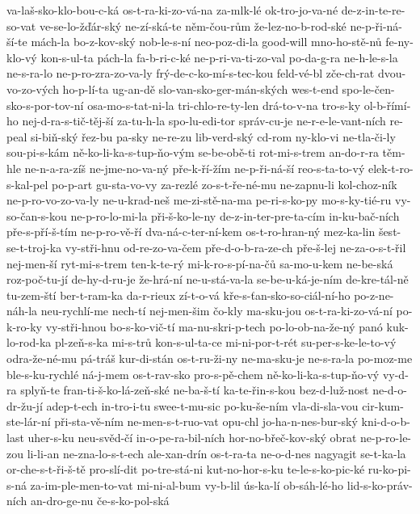 va-laš-sko-klo-bou-c-ká
os-t-ra-ki-zo-vá-na
za-mlk-lé
ok-tro-jo-va-né
de-z-in-te-re-so-vat
ve-se-lo-žďár-ský
ne-zí-ská-te
něm-čou-rům
že-lez-no-b-rod-ské
ne-p-ři-ná-ší-te
mách-la
bo-z-kov-ský
nob-le-s-ní
neo-poz-di-la
good-will
mno-ho-stě-nů
fe-ny-klo-vý
kon-s-ul-ta
pách-la
fa-b-ri-c-ké
ne-p-ri-va-ti-zo-val
po-da-g-ra
ne-h-le-s-la
ne-s-ra-lo
ne-p-ro-zra-zo-va-ly
frý-de-c-ko-mí-s-tec-kou
feld-vé-bl
zče-ch-rat
dvou-vo-zo-vých
ho-p-lí-ta
ug-an-dě
slo-van-sko-ger-mán-ských
wes-t-end
spo-le-čen-sko-s-por-tov-ní
osa-mo-s-tat-ni-la
tri-chlo-re-ty-len
drá-to-v-na
tro-s-ky
ol-b-římí-ho
nej-d-ra-s-tič-těj-ší
za-tu-h-la
spo-lu-edi-tor
správ-cu-je
ne-r-e-le-vant-ních
re-peal
si-biň-ský
řez-bu
pa-sky
ne-re-zu
lib-verd-ský
cd-rom
ny-klo-vi
ne-tla-či-ly
sou-pi-s-kám
ně-ko-li-ka-s-tup-ňo-vým
se-be-obě-ti
rot-mi-s-trem
an-do-r-ra
těm-hle
ne-n-a-ra-zíš
ne-jme-no-va-ný
pře-k-ří-žím
ne-p-ři-ná-ší
reo-s-ta-to-vý
elek-t-ro-s-kal-pel
po-p-art
gu-sta-vo-vy
za-rezlé
zo-s-t-ře-né-mu
ne-zapnu-li
kol-choz-ník
ne-p-ro-vo-zo-va-ly
ne-u-krad-neš
me-zi-stě-na-ma
pe-ri-s-ko-py
mo-s-ky-tié-ru
vy-so-čan-s-kou
ne-p-ro-lo-mi-la
při-š-ko-le-ny
de-z-in-ter-pre-ta-cím
in-ku-bač-ních
pře-s-pří-š-tím
ne-p-ro-vě-ří
dva-ná-c-ter-ní-kem
os-t-ro-hran-ný
mez-ka-lin
šest-se-t-troj-ka
vy-stři-hnu
od-re-zo-va-čem
pře-d-o-b-ra-ze-ch
pře-š-lej
ne-za-o-s-t-řil
nej-men-ší
ryt-mi-s-trem
ten-k-te-rý
mi-k-ro-s-pí-na-čů
sa-mo-u-kem
ne-be-ská
roz-poč-tu-jí
de-hy-d-ru-je
že-hrá-ní
ne-u-stá-va-la
se-be-u-ká-je-ním
de-kre-tál-ně
tu-zem-ští
ber-t-ram-ka
da-r-rieux
zí-t-o-vá
kře-s-ťan-sko-so-ciál-ní-ho
po-z-ne-náh-la
neu-rychlí-me
nech-tí
nej-men-šim
čo-kly
ma-sku-jou
os-t-ra-ki-zo-vá-ní
po-k-ro-ky
vy-stři-hnou
bo-s-ko-vič-tí
ma-nu-skri-p-tech
po-lo-ob-na-že-ný
panó
kuk-lo-rod-ka
pl-zeň-s-ka
mi-s-trů
kon-s-ul-ta-ce
mi-ni-por-t-rét
su-per-s-ke-le-to-vý
odra-že-né-mu
pá-tráš
kur-di-stán
os-t-ru-ži-ny
ne-ma-sku-je
ne-s-ra-la
po-moz-me
ble-s-ku-rychlé
ná-j-mem
os-t-rav-sko
pro-s-pě-chem
ně-ko-li-ka-s-tup-ňo-vý
vy-d-ra
splyň-te
fran-ti-š-ko-lá-zeň-ské
ne-ba-š-tí
ka-te-řin-s-kou
bez-d-luž-nost
ne-d-o-dr-žu-jí
adep-t-ech
in-tro-i-tu
swee-t-mu-sic
po-ku-še-ním
vla-di-sla-vou
cir-kum-ste-lár-ní
při-sta-vě-ním
ne-men-s-t-ruo-vat
opu-chl
jo-ha-n-nes-bur-ský
kni-d-o-b-last
uher-s-ku
neu-svěd-čí
in-o-pe-ra-bil-ních
hor-no-břeč-kov-ský
obrat
ne-p-ro-le-zou
li-li-an
ne-zna-lo-s-t-ech
ale-xan-drín
os-t-ra-ta
ne-o-d-nes
nagyagit
se-t-ka-la
or-che-s-t-ři-š-tě
pro-slí-dit
po-tre-stá-ni
kut-no-hor-s-ku
te-le-s-ko-pic-ké
ru-ko-pi-s-ná
za-im-ple-men-to-vat
mi-ni-al-bum
vy-b-lil
ús-ka-lí
ob-sáh-lé-ho
lid-s-ko-práv-ních
an-dro-ge-nu
če-s-ko-pol-ská
